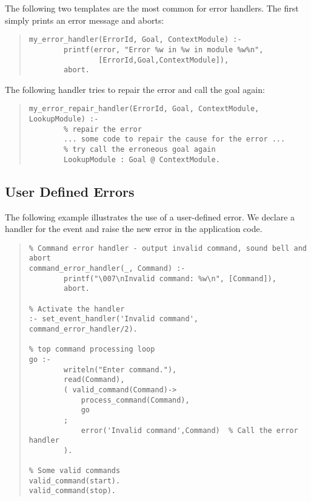 The following two templates are the most common for error handlers.
The first simply prints an error message and aborts:
\begin{quote}
\begin{verbatim}
my_error_handler(ErrorId, Goal, ContextModule) :-
        printf(error, "Error %w in %w in module %w%n",
                [ErrorId,Goal,ContextModule]),
        abort.
\end{verbatim}
\end{quote}
The following handler tries to repair the error and call the goal again:
\begin{quote}
\begin{verbatim}
my_error_repair_handler(ErrorId, Goal, ContextModule, LookupModule) :-
        % repair the error
        ... some code to repair the cause for the error ...
        % try call the erroneous goal again
        LookupModule : Goal @ ContextModule.
\end{verbatim}
\end{quote}


\subsection{User Defined Errors}
\label{user-errors}
The following example illustrates the use of a user-defined error.
We declare a handler for the event  and
raise the new error in the application code.
\begin{quote}
\begin{verbatim}
% Command error handler - output invalid command, sound bell and abort
command_error_handler(_, Command) :-
        printf("\007\nInvalid command: %w\n", [Command]),
        abort.

% Activate the handler
:- set_event_handler('Invalid command', command_error_handler/2).

% top command processing loop
go :-
        writeln("Enter command."),
        read(Command),
        ( valid_command(Command)->
            process_command(Command),
            go
        ;
            error('Invalid command',Command)  % Call the error handler
        ).

% Some valid commands
valid_command(start).
valid_command(stop).
\end{verbatim}
\end{quote}




